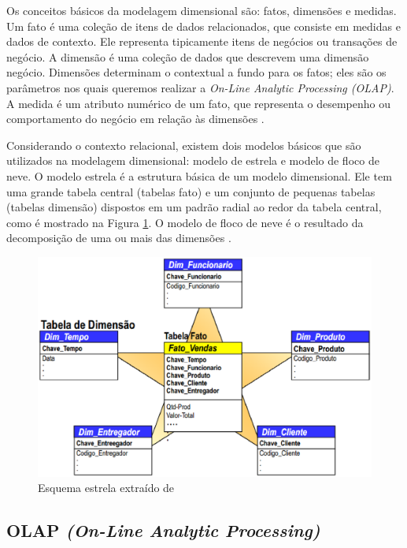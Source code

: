 Os conceitos básicos da modelagem dimensional são: fatos, dimensões e medidas. Um fato é uma coleção de itens de dados relacionados, que consiste em medidas e dados de contexto. Ele representa tipicamente itens de negócios ou transações de negócio. A dimensão é uma coleção de dados que descrevem uma dimensão negócio. Dimensões determinam o contextual a fundo para os fatos; eles são os parâmetros nos quais queremos realizar a \textit{On-Line Analytic Processing (OLAP)}. A medida é um atributo numérico de um fato, que representa o desempenho ou comportamento do negócio em relação às dimensões \cite{marotta2000}.

Considerando o contexto relacional, existem dois modelos básicos que são utilizados na modelagem dimensional: modelo de estrela e modelo de floco de neve. O modelo estrela é a estrutura básica de um modelo dimensional. Ele tem uma grande tabela central (tabelas fato) e um conjunto de pequenas tabelas (tabelas dimensão) dispostos em um padrão radial 
ao redor da tabela central, como é mostrado na Figura \ref{fig:estrela}. O modelo de floco de neve é o resultado da decomposição de uma ou mais das dimensões \cite{marotta2000}.
 
\begin{figure}[h!]
\centering
\includegraphics[keepaspectratio=false,scale=0.50]{figuras/figuras_nilton/star.eps}
\caption{Esquema estrela extraído de }
\label{fig:estrela}
\end{figure}
\FloatBarrier
 
\subsection{OLAP \textit{(On-Line Analytic Processing)}}

